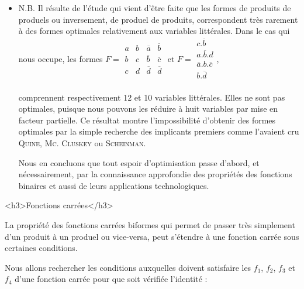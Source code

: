 \begin{itemize}
\item N.B. Il résulte de l'étude qui vient d'être faite que les formes de produits de produels ou inversement, de produel de produits, correspondent très rarement à des formes optimales relativement aux variables littérales. Dans le cas qui nous occupe, les formes $ F = \begin{array}{|c|c|c|c|}  a & b & \overline{a} & \overline{b} \\
                          b & c & \overline{b} & \overline{c} \\
                          c & d & \overline{d} & \overline{d} \\
                         \end{array}  
                         \text{ et }  F = \begin{array}{|c|} c . \overline{b} \\
                                          a . \overline{b} . d \\
                                          \overline{a} . b . \overline{c} \\
                                          b . \overline{d} \\
                                          \end{array}$, 
                                          
comprennent respectivement 12 et 10 variables littérales. Elles ne sont pas optimales, puisque nous pouvons les réduire à huit variables par mise en facteur partielle. Ce résultat montre l'impossibilité d'obtenir des formes optimales par la simple recherche des implicants premiers comme l'avaient cru \textsc{Quine}, \textsc{Mc. Cluskey} ou \textsc{Scheinman}.                                       

Nous en concluons que tout espoir d'optimisation passe d'abord, et nécessairement, par la connaissance approfondie des propriétés des fonctions binaires et aussi de leurs applications technologiques.
\end{itemize}


<h3>Fonctions carrées</h3>




La propriété des fonctions carrées biformes qui permet de passer très simplement d'un produit à un produel ou vice-versa, peut s'étendre à une fonction carrée sous certaines conditions. 

Nous allons rechercher les conditions auxquelles doivent satisfaire les $f_1$, $f_2$, $f_3$ et $f_4$ d'une fonction carrée pour que soit vérifiée l'identité : 



